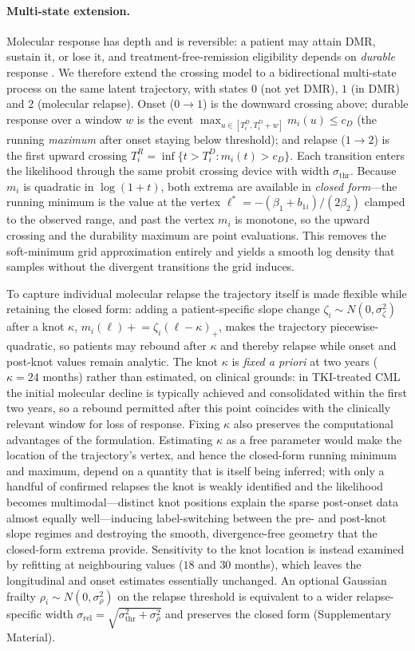 \documentclass[11pt]{article}
\begin{document}
\paragraph{Multi-state extension.}
Molecular response has depth and is reversible: a patient may attain DMR,
sustain it, or lose it, and treatment-free-remission eligibility depends on
\emph{durable} response \cite{Li2014TKIEfficacy,Hanfstein2012EMR}. We therefore
extend the crossing model to a bidirectional multi-state process on the same
latent trajectory, with states $0$ (not yet DMR), $1$ (in DMR) and $2$
(molecular relapse). Onset ($0\to1$) is the downward crossing above; durable
response over a window $w$ is the event $\max_{u\in[T_i^D,T_i^D+w]}m_i(u)\le c_D$
(the running \emph{maximum} after onset staying below threshold); and relapse
($1\to2$) is the first upward crossing
$T_i^R=\inf\{t>T_i^D:m_i(t)>c_D\}$. Each transition enters the likelihood
through the same probit crossing device with width $\sigma_{\mathrm{thr}}$.
Because $m_i$ is quadratic in $\log(1+t)$, both extrema are available in
\emph{closed form}---the running minimum is the value at the vertex
$\ell^\ast=-(\beta_1+b_{1i})/(2\beta_2)$ clamped to the observed range, and past
the vertex $m_i$ is monotone, so the upward crossing and the durability maximum
are point evaluations. This removes the soft-minimum grid approximation
entirely and yields a smooth log density that samples without the divergent
transitions the grid induces.

To capture individual molecular relapse the trajectory itself is made flexible
while retaining the closed form: adding a patient-specific slope change
$\zeta_i\sim N(0,\sigma_\zeta^2)$ after a knot $\kappa$,
$m_i(\ell)\mathrel{+}{=}\zeta_i(\ell-\kappa)_+$, makes the trajectory
piecewise-quadratic, so patients may rebound after $\kappa$ and thereby relapse
while onset and post-knot values remain analytic. The knot $\kappa$ is
\emph{fixed a priori} at two years ($\kappa=24$ months) rather than estimated,
on clinical grounds: in TKI-treated CML the initial molecular decline is
typically achieved and consolidated within the first two years, so a rebound
permitted after this point coincides with the clinically relevant window for
loss of response. Fixing $\kappa$ also preserves the computational advantages of
the formulation. Estimating $\kappa$ as a free parameter would make the location
of the trajectory's vertex, and hence the closed-form running minimum and
maximum, depend on a quantity that is itself being inferred; with only a handful
of confirmed relapses the knot is weakly identified and the likelihood becomes
multimodal---distinct knot positions explain the sparse post-onset data almost
equally well---inducing label-switching between the pre- and post-knot slope
regimes and destroying the smooth, divergence-free geometry that the closed-form
extrema provide. Sensitivity to the knot location is instead examined by
refitting at neighbouring values ($18$ and $30$ months), which leaves the
longitudinal and onset estimates essentially unchanged. An optional Gaussian frailty
$\rho_i\sim N(0,\sigma_\rho^2)$ on the relapse threshold is equivalent to a
wider relapse-specific width
$\sigma_{\mathrm{rel}}=\sqrt{\sigma_{\mathrm{thr}}^2+\sigma_\rho^2}$ and
preserves the closed form (Supplementary Material).
\end{document}
